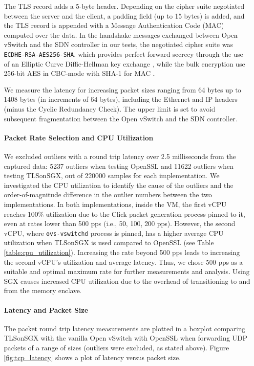 {The TLS record adds a 5-byte header.
Depending on the cipher suite negotiated between the server and the client, a padding field (up to 15 bytes) is added, and the TLS record is appended with a Message Authentication Code (MAC) computed over the data.
In the handshake messages exchanged between Open vSwitch and the SDN controller in our tests, the negotiated cipher suite was \texttt{ECDHE-RSA-AES256-SHA}, which provides perfect forward secrecy through the use of an Elliptic Curve Diffie-Hellman key exchange \cite{rfc4492}, while the bulk encryption use 256-bit AES in CBC-mode with SHA-1 for MAC \cite{rfc3268}.

We measure the latency for increasing packet sizes ranging from 64 bytes up to 1408 bytes (in increments of 64 bytes), including the Ethernet and IP headers (minus the Cyclic Redundancy Check).
The upper limit is set to avoid subsequent fragmentation between the Open vSwitch and the SDN controller.

\paragraph{Packet Rate Selection and CPU Utilization}
We excluded outliers with a round trip latency over 2.5 milliseconds from the captured data: 5237 outliers when testing OpenSSL and 11622 outliers when testing TLSonSGX, out of 220000 samples for each implementation.
We investigated the CPU utilization to identify the cause of the outliers and the order-of-magnitude difference in the outlier numbers between the two implementations.
In both implementations, inside the VM, the first vCPU reaches 100\% utilization due to the Click packet generation process pinned to it, even at rates lower than 500 pps (i.e., 50, 100, 200 pps). 
However, the second vCPU, where \texttt{ovs-vswitchd} process is pinned, has a higher average CPU utilization when TLSonSGX is used compared to OpenSSL (see Table \ref{table:cpu_utilization}). 
Increasing the rate beyond 500 pps leads to increasing the second vCPU's utilization and average latency.
Thus, we chose 500 pps as a suitable and optimal maximum rate for further measurements and analysis.
Using SGX causes increased CPU utilization due to the overhead of transitioning to and from the memory enclave.

\paragraph{Latency and Packet Size}
The packet round trip latency measurements are plotted in a boxplot comparing TLSonSGX with the vanilla Open vSwitch with OpenSSL when forwarding UDP packets of a range of sizes (outliers were excluded, as stated above).
Figure \ref{fig:tcp_latency} shows a plot of latency versus packet size.

}
